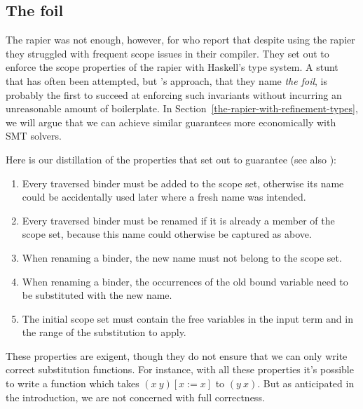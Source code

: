 \documentclass[sigconf, review]{acmart}
\begin{document}
\subsection{The foil}
\label{the-rapier-with-stronger-types}

The rapier was not enough, however, for \citet{maclaurin23} who report that
despite using the rapier they struggled with frequent scope issues in their
compiler. They set out to enforce the scope properties of the rapier with
Haskell's type system. A stunt that has often been attempted, but
\citeauthor{maclaurin23}'s approach, that they name \emph{the foil}, is probably the
first to succeed at enforcing such invariants without incurring an unreasonable
amount of boilerplate.
In Section~\ref{the-rapier-with-refinement-types}, we will argue that we can
achieve similar guarantees more economically with SMT solvers.

Here is our distillation of the properties that \citeauthor{maclaurin23} set
out to guarantee (see also \cite[Section~4]{maclaurin23}):
\begin{enumerate}
\item Every traversed binder must be added to the scope set, otherwise its name
      could be accidentally used later where a fresh name was intended.
\item \label{req:always-rename} Every traversed binder must be renamed if it is already a member of the
      scope set, because this name could otherwise be captured as above.
\item When renaming a binder, the new name must not belong to the scope set.
\item When renaming a binder, the occurrences of the old bound variable need
      to be substituted with the new name.
\item The initial scope set must contain the free variables in the input term
      and in the range of the substitution to apply.
\end{enumerate}

These properties are exigent, though they do not ensure that we can only write correct
substitution functions. For instance, with all these properties it's possible
to write a function which takes $(x\ y)[x:=x]$ to $(y\ x)$.
But as anticipated in the
introduction, we are not concerned with full correctness.
\end{document}
